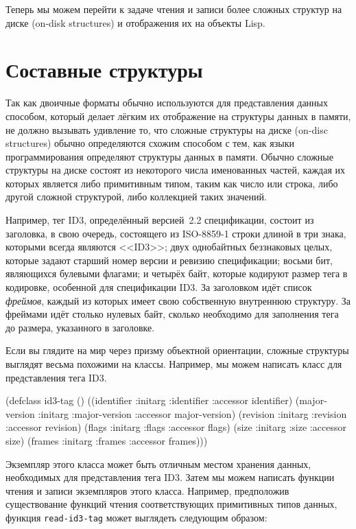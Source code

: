 Теперь мы можем перейти к задаче чтения и записи более сложных структур на диске (on-disk
structures) и отображения их на объекты Lisp.

\section{Составные структуры}

Так как двоичные форматы обычно используются для представления данных способом, который
делает лёгким их отображение на структуры данных в памяти, не должно вызывать удивление
то, что сложные структуры на диске (on-disc structures) обычно определяются схожим
способом с тем, как языки программирования определяют структуры данных в памяти. Обычно
сложные структуры на диске состоят из некоторого числа именованных частей, каждая их
которых является либо примитивным типом, таким как число или строка, либо другой сложной
структурой, либо коллекцией таких значений.

Например, тег ID3, определённый версией~2.2 спецификации, состоит из заголовка, в свою
очередь, состоящего из ISO-8859-1 строки длиной в три знака, которыми всегда являются
<<ID3>>; двух однобайтных беззнаковых целых, которые задают старший номер версии и ревизию
спецификации; восьми бит, являющихся булевыми флагами; и четырёх байт, которые кодируют
размер тега в кодировке, особенной для спецификации ID3. За заголовком идёт список
\textit{фреймов}, каждый из которых имеет свою собственную внутреннюю структуру. За
фреймами идёт столько нулевых байт, сколько необходимо для заполнения тега до размера,
указанного в заголовке.

Если вы глядите на мир через призму объектной ориентации, сложные структуры выглядят
весьма похожими на классы. Например, мы можем написать класс для представления тега ID3.

\begin{myverb}
(defclass id3-tag ()
  ((identifier    :initarg :identifier    :accessor identifier)
   (major-version :initarg :major-version :accessor major-version)
   (revision      :initarg :revision      :accessor revision)
   (flags         :initarg :flags         :accessor flags)
   (size          :initarg :size          :accessor size)
   (frames        :initarg :frames        :accessor frames)))
\end{myverb}

Экземпляр этого класса может быть отличным местом хранения данных, необходимых для
представления тега ID3. Затем мы можем написать функции чтения и записи экземпляров этого
класса. Например, предположив существование функций чтения соответствующих примитивных
типов данных, функция \lstinline{read-id3-tag} может выглядеть следующим образом:


